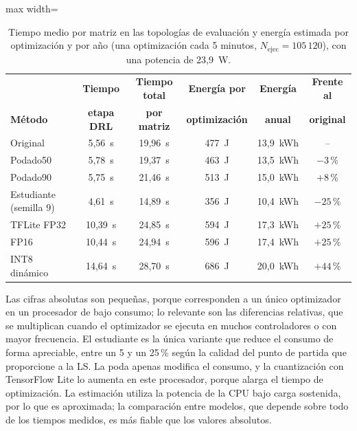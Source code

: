 \begin{table}[H]
	\centering
	\footnotesize
	\setlength{\tabcolsep}{4pt}
	\begin{adjustbox}{max width=\textwidth}
	\begin{tabular}{lccccc}
		\toprule
		& \textbf{Tiempo} & \textbf{Tiempo total} & \textbf{Energía por} & \textbf{Energía} & \textbf{Frente al} \\
		\textbf{Método} & \textbf{etapa DRL} & \textbf{por matriz} & \textbf{optimización} & \textbf{anual} & \textbf{original} \\
		\midrule
		Original & 5,56~s & 19,96~s & 477~J & 13,9~kWh & -- \\
		Podado50 & 5,78~s & 19,37~s & 463~J & 13,5~kWh & $-3$\,\% \\
		Podado90 & 5,75~s & 21,46~s & 513~J & 15,0~kWh & $+8$\,\% \\
		Estudiante (semilla 9) & 4,61~s & 14,89~s & 356~J & 10,4~kWh & $-25$\,\% \\
		TFLite FP32 & 10,39~s & 24,85~s & 594~J & 17,3~kWh & $+25$\,\% \\
		FP16 & 10,44~s & 24,94~s & 596~J & 17,4~kWh & $+25$\,\% \\
		INT8 dinámico & 14,64~s & 28,70~s & 686~J & 20,0~kWh & $+44$\,\% \\
		\bottomrule
	\end{tabular}
	\end{adjustbox}
	\caption[Energía estimada por optimización y anual]{Tiempo medio por matriz en las topologías de evaluación y energía estimada por optimización y por año (una optimización cada 5 minutos, $N_{\text{ejec}} = 105\,120$), con una potencia de 23,9~W.}
	\label{tab:res_energia}
\end{table}

Las cifras absolutas son pequeñas, porque corresponden a un único optimizador en un procesador de bajo consumo; lo relevante son las diferencias relativas, que se multiplican cuando el optimizador se ejecuta en muchos controladores o con mayor frecuencia. El estudiante es la única variante que reduce el consumo de forma apreciable, entre un 5 y un 25\,\% según la calidad del punto de partida que proporcione a la LS. La poda apenas modifica el consumo, y la cuantización con TensorFlow Lite lo aumenta en este procesador, porque alarga el tiempo de optimización. La estimación utiliza la potencia de la CPU bajo carga sostenida, por lo que es aproximada; la comparación entre modelos, que depende sobre todo de los tiempos medidos, es más fiable que los valores absolutos.

